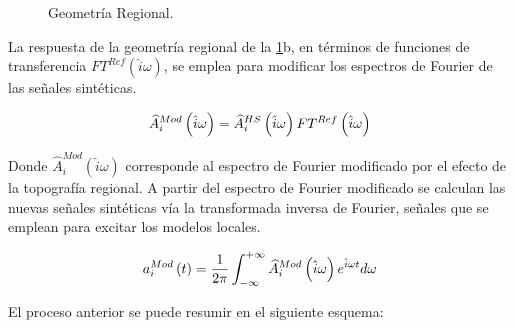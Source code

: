 \documentclass[spanish,letterpaper,12pt,twoside,openany]{article}
\begin{document}
\begin{figure}[H]
	\centering
	\hspace{.25 cm}
	\vspace{-.5 cm}
    \caption{Geometría Regional.}
    \label{fig:geolocreg}
    \vspace{-1 cm}
\end{figure}
%

La respuesta de la geometría regional de la \cref{fig:geolocreg}b, en términos de funciones de transferencia $FT^{Ref} \left(\hat{i} \omega \right)$, se emplea para modificar los espectros de Fourier de las señales sintéticas.
%
\begin{large}
	\begin{align}\label{eq:espfoumod}
		\widehat{A}^{Mod}_{i} \left( \hat{i} \omega \right) = \widehat{A}^{HS}_{i} \left( \hat{i} \omega \right) FT^{Ref} \left( \hat{i} \omega \right)
	\vspace{-1 cm}
	\end{align}
\end{large}
%
Donde $\widehat{A}^{Mod}_{i} \left( \hat{i} \omega \right)$ corresponde al espectro de Fourier modificado por el efecto de la topografía regional. A partir del espectro de Fourier modificado se calculan las nuevas señales sintéticas vía la transformada inversa de Fourier, señales que se emplean para excitar los modelos locales.
%
\begin{large}
	\begin{align}\label{eq:fourinv}
		a_{i}^{Mod} \left( t \right) = \dfrac{1}{2 \pi} \int_{-\infty}^{+\infty} \widehat{A}^{Mod}_{i} \left( \hat{i} \omega \right) e^{\hat{i} \omega t} d \omega
	\vspace{-1 cm}
	\end{align}
\end{large}
%
El proceso anterior se puede resumir en el siguiente esquema:
\end{document}
